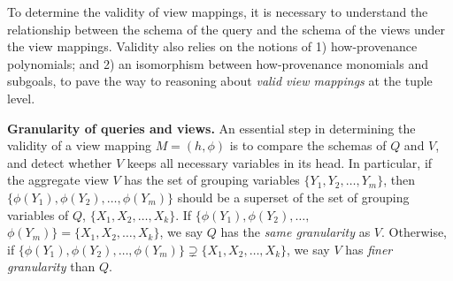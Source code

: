 

To determine the validity of view mappings, it is necessary to understand the relationship between the schema of the query and the schema of the views under the view mappings. Validity also relies on the notions of 1) how-provenance polynomials; and 2) an isomorphism between how-provenance monomials and subgoals, to pave the way to reasoning about {\em valid view mappings} at the tuple level.

\textbf{Granularity of queries and views.} An essential step in determining the validity of a view mapping $M=(h,\phi)$ is to compare the schemas of $Q$ and $V$, and detect whether $V$ keeps all necessary variables in its head. In particular, 
if the aggregate view $V$ has the set of grouping variables $\{Y_1, Y_2,\dots, Y_m\}$, then $\{\phi(Y_1), \phi(Y_2), \dots, \phi(Y_m)\}$ should be a superset of the set of grouping variables of $Q$, $\{X_1, X_2,\dots, X_k\}$. If $\{\phi(Y_1), \phi(Y_2), \dots,$ $\phi(Y_m)\} = \{X_1, X_2,\dots, X_k\}$, we say $Q$ has the {\em same granularity} as $V$. Otherwise, if $\{\phi(Y_1), \phi(Y_2), \dots, \phi(Y_m)\} \supsetneq \{X_1, X_2,\dots, X_k\}$, we say $V$ has {\em finer granularity} than $Q$.



